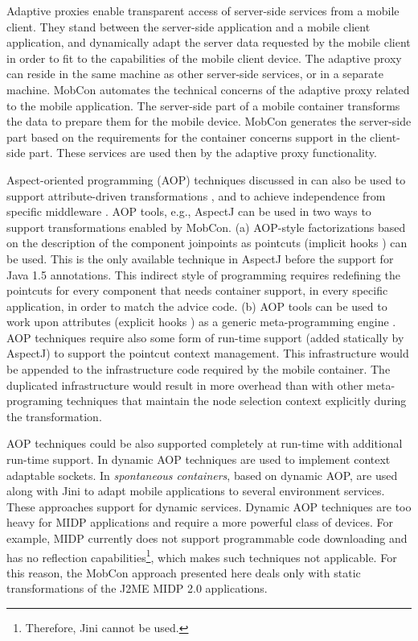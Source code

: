 Adaptive proxies \cite{fox96adapting,fox98adapting} enable transparent access of server-side services from a mobile client. They stand between the server-side application and a mobile client application, and dynamically adapt the server data requested by the mobile client in order to fit to the capabilities of the mobile client device. The adaptive proxy can reside in the same machine as other server-side services, or in a separate machine. 
MobCon automates the technical concerns of the adaptive proxy related to the mobile application. The server-side part of a mobile container transforms the data to prepare them for the mobile device. MobCon generates the server-side part based on the requirements for the container concerns support in the client-side part. These services are used then by the adaptive proxy functionality.

Aspect-oriented programming (AOP) \cite{kiczalesetal.97} techniques discussed in  can also be used to support attribute-driven transformations \cite{aop.attrib.05}, and to achieve independence from specific middleware \cite{aop.middleware.03}. AOP tools, e.g., AspectJ \cite{Laddad.aop, www.aspectjt} can be used in two ways to support transformations enabled by MobCon. (a) AOP-style factorizations based on the description of the component joinpoints as pointcuts (implicit hooks \cite{java.compost}) can be used. This is the only available technique in AspectJ before the support for Java 1.5 annotations. This indirect style of programming requires redefining the pointcuts for every component that needs container support, in every specific application, in order to match the advice code. (b) AOP tools can be used to work upon attributes (explicit hooks \cite{java.compost}) as a generic meta-programming engine . AOP techniques require also some form of run-time support (added statically by AspectJ) to support the pointcut context management. This infrastructure would be appended to the infrastructure code required by the mobile container. The duplicated infrastructure would result in more overhead than with other meta-programing techniques that maintain the node selection context explicitly during the transformation.

AOP techniques could be also supported completely at run-time with additional run-time support. In \cite{aop.da.02} dynamic AOP techniques are used to implement context adaptable sockets. In \cite{spont.container} \textit{spontaneous containers}, based on dynamic AOP, are used along with Jini \cite{www.sunjini} to adapt mobile applications to several environment services. These approaches support for dynamic services. Dynamic AOP techniques are too heavy for MIDP applications and require a more powerful class of devices. For example, MIDP currently does not support programmable code downloading and has no reflection capabilities\footnote{Therefore, Jini \cite{www.sunjini} cannot be used.}, which makes such techniques not applicable. For this reason, the MobCon approach presented here deals only with static transformations of the J2ME MIDP 2.0 applications.

